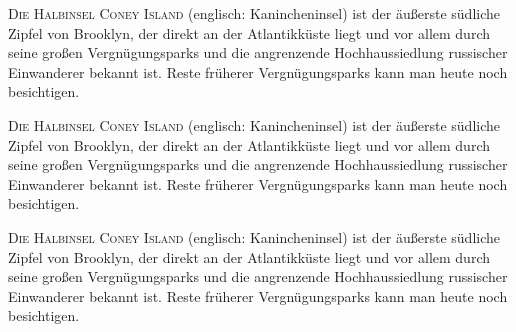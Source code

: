 \documentclass{article}
\begin{document}
\lettrine{D}{ie Halbinsel Coney Island} (englisch: Kanin­chen­insel) ist der äußer­ste süd­liche Zipfel von Brook­lyn, der direkt an der At­lantik­küste liegt und vor allem durch seine großen Ver­gnü­gungs­parks und die an­gren­zende Hoch­haus­sied­lung rus­si­scher Ein­wan­derer be­kannt ist. Reste früherer Ver­gnü­gungs­parks kann man heute noch be­sich­tigen. 

\bigskip

\lettrine[lines=1]{D}{ie Halbinsel Coney Island} (englisch: Kanin­chen­insel) ist der äußer­ste süd­liche Zipfel von Brook­lyn, der direkt an der At­lantik­küste liegt und vor allem durch seine großen Ver­gnü­gungs­parks und die an­gren­zende Hoch­haus­sied­lung rus­si­scher Ein­wan­derer be­kannt ist. Reste früherer Ver­gnü­gungs­parks kann man heute noch be­sich­tigen. 

\bigskip

\lettrine[lines=3]{D}{ie Halbinsel Coney Island} (englisch: Kanin­chen­insel) ist der äußer­ste süd­liche Zipfel von Brook­lyn, der direkt an der At­lantik­küste liegt und vor allem durch seine großen Ver­gnü­gungs­parks und die an­gren­zende Hoch­haus­sied­lung rus­si­scher Ein­wan­derer be­kannt ist. Reste früherer Ver­gnü­gungs­parks kann man heute noch be­sich­tigen. 
\end{document}

